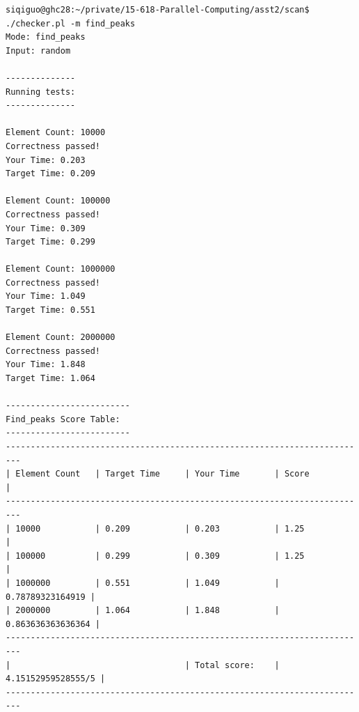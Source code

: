 \documentclass[letterpaper,11pt]{exam}
\begin{document}
\begin{questions}
\begin{enumerate}[label=\roman*.]
              \begin{lstlisting}[]
siqiguo@ghc28:~/private/15-618-Parallel-Computing/asst2/scan$ ./checker.pl -m find_peaks
Mode: find_peaks
Input: random

--------------
Running tests:
--------------

Element Count: 10000
Correctness passed!
Your Time: 0.203
Target Time: 0.209

Element Count: 100000
Correctness passed!
Your Time: 0.309
Target Time: 0.299

Element Count: 1000000
Correctness passed!
Your Time: 1.049
Target Time: 0.551

Element Count: 2000000
Correctness passed!
Your Time: 1.848
Target Time: 1.064

-------------------------
Find_peaks Score Table:
-------------------------
-------------------------------------------------------------------------
| Element Count   | Target Time     | Your Time       | Score           |
-------------------------------------------------------------------------
| 10000           | 0.209           | 0.203           | 1.25            |
| 100000          | 0.299           | 0.309           | 1.25            |
| 1000000         | 0.551           | 1.049           | 0.78789323164919 |
| 2000000         | 1.064           | 1.848           | 0.863636363636364 |
-------------------------------------------------------------------------
|                                   | Total score:    | 4.15152959528555/5 |
-------------------------------------------------------------------------
                    \end{lstlisting}



\end{enumerate}
\end{questions}
\end{document}
